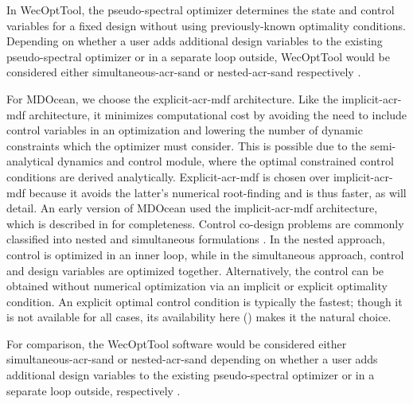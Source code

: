     In WecOptTool, the pseudo-spectral optimizer determines the state and control variables for a fixed design without using previously-known optimality conditions.
    Depending on whether a user adds additional design variables to the existing pseudo-spectral optimizer or in a separate loop outside, WecOptTool would be considered either simultaneous-\gls{acr-sand} or nested-\gls{acr-sand} respectively \citep{coe_initial_2020}.
    
    For MDOcean, we choose the explicit-\gls{acr-mdf} architecture.
    Like the implicit-\gls{acr-mdf} architecture, it minimizes computational cost by avoiding the need to include control variables in an optimization and lowering the number of dynamic constraints which the optimizer must consider.
    This is possible due to the semi-analytical dynamics and control module, where the optimal constrained control conditions are derived analytically.
    Explicit-\gls{acr-mdf} is chosen over implicit-\gls{acr-mdf} because it avoids the latter's numerical root-finding and is thus faster, as  will detail.
    An early version of MDOcean used the implicit-\gls{acr-mdf} architecture, which is described in  for completeness.
\else
    Control co-design problems are commonly classified into nested and simultaneous formulations \citep{sundarrajan_towards_2021,herber_nested_2018}.
    In the nested approach, control is optimized in an inner loop, while in the simultaneous approach, control and design variables are optimized together.
    Alternatively, the control can be obtained without numerical optimization via an implicit or explicit optimality condition. 
    An explicit optimal control condition is typically the fastest; though it is not available for all cases, its availability here () makes it the natural choice.
    
    For comparison, the WecOptTool software would be considered either simultaneous-\gls{acr-sand} or nested-\gls{acr-sand} depending on whether a user adds additional design variables to the existing pseudo-spectral optimizer or in a separate loop outside, respectively \citep{coe_initial_2020}.
\fi


